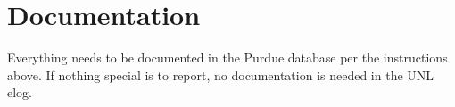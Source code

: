 \documentclass[12pt]{unlsilabsop}
\begin{document}
\section{Documentation}
Everything needs to be documented in the Purdue database per the instructions above. If nothing special is to report, no documentation is needed in the UNL elog.
\end{document}
